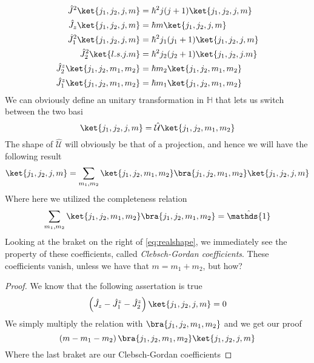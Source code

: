 \documentclass[a4paper, 11pt]{book}
\newcommand{\1}{\opr{\mathds{1}}}
\newcommand{\opr}[1]{\hat{#1}}
\newcommand{\U}{\opr{\mathcal{U}}}
\newcommand{\hilbert}{\mathbb{H}}
\theoremstyle{plain}
\begin{document}
	\begin{equation}
		\begin{aligned}
			\opr{J}^2\ket{j_1,j_2,j,m}&=\hbar^2j(j+1)\ket{j_1,j_2,j,m}\\
			\opr{J}_z\ket{j_1,j_2,j,m}&=\hbar m\ket{j_1,j_2,j,m}\\
			\opr{J}_1^2\ket{j_1,j_2,j,m}&=\hbar^2j_1(j_1+1)\ket{j_1,j_2,j,m}\\
			\opr{J}_2^2\ket{l.s.j.m}&=\hbar^2j_2(j_2+1)\ket{j_1,j_2,j.m}\\
			\opr{J}_2^z\ket{j_1,j_2,m_1,m_2}&=\hbar m_2\ket{j_1,j_2,m_1,m_2}\\
			\opr{J}_1^z\ket{j_1,j_2,m_1,m_2}&=\hbar m_1\ket{j_1,j_2,m_1,m_2}
		\end{aligned}
		\label{eq:totalketaction}
	\end{equation}
	We can obviously define an unitary transformation in $\hilbert$ that lets us switch between the two basi
	\begin{equation}
		\ket{j_1,j_2,j,m}=\U\ket{j_1,j_2,m_1,m_2}
		\label{eq:unitarytransfclebsh}
	\end{equation}
	The shape of $\U$ will obviously be that of a projection, and hence we will have the following result
	\begin{equation}
		\ket{j_1,j_2,j,m}=\sum_{m_1,m_2}\ket{j_1,j_2,m_1,m_2}\bra{j_1,j_2,m_1,m_2}\ket{j_1,j_2,j,m}
		\label{eq:realshape}
	\end{equation}
	Where here we utilized the completeness relation
	\begin{equation*}
		\sum_{m_1,m_2}\ket{j_1,j_2,m_1,m_2}\bra{j_1,j_2,m_1,m_2}=\1
	\end{equation*}
	Looking at the braket on the right of \eqref{eq:realshape}, we immediately see the property of these coefficients, called \textit{Clebsch-Gordan coefficients}. These coefficients vanish, unless we have that $m=m_1+m_2$, but how?
	\begin{proof}
	We know that the following assertation is true
	\begin{equation*}
		\left( \opr{J}_z-\opr{J}_1^z-\opr{J}_2^z \right)\ket{j_1,j_2,j,m}=0
	\end{equation*}
	We simply multiply the relation with $\bra{j_1,j_2,m_1,m_2}$ and we get our proof
	\begin{equation*}
		\left( m-m_1-m_2 \right)\bra{j_1,j_2,m_1,m_2}\ket{j_1,j_2,j,m}
	\end{equation*}
	Where the last braket are our Clebsch-Gordan coefficients
	\end{proof}
\end{document}
